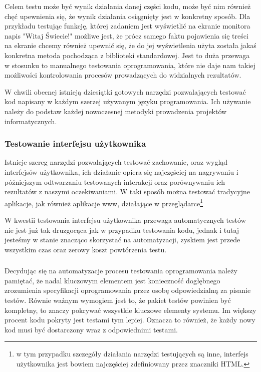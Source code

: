         Celem testu może być wynik działania danej części kodu, może być nim również chęć upewnienia się, że wynik działania osiągnięty jest w konkretny sposób. Dla przykładu testując funkcję, której zadaniem jest wyświetlić na ekranie monitora napis "Witaj Świecie!" możliwe jest, że prócz samego faktu pojawienia się treści na ekranie chcemy również upewnić się, że do jej wyświetlenia użyta została jakaś konkretna metoda pochodząca z biblioteki standardowej. Jest to duża przewaga w stosunku to manualnego testowania oprogramowania, które nie daje nam takiej możliwości kontrolowania procesów prowadzących do widzialnych rezultatów.

        W chwili obecnej istnieją dziesiątki gotowych narzędzi pozwalających testować kod napisany w każdym szerzej używanym języku programowania. Ich używanie należy do podstaw każdej nowoczesnej metodyki prowadzenia projektów informatycznych.
        
      \subsubsection{Testowanie interfejsu użytkownika}
        
        Istnieje szereg narzędzi pozwalających testować zachowanie, oraz wygląd interfejsów użytkownika, ich działanie opiera się najczęściej na nagrywaniu i późniejszym odtwarzaniu testowanych interakcji oraz porównywaniu ich rezultatów z naszymi oczekiwaniami. W taki sposób można testować tradycyjne aplikacje, jak również aplikacje www, działające w przeglądarce\footnote{w tym  przypadku szczegóły działania narzędzi testujących są inne, interfejs użytkownika jest bowiem najczęściej zdefiniowany przez znaczniki HTML.}
        
        W kwestii testowania interfejsu użytkownika przewaga automatycznych testów nie jest już tak druzgocąca jak w przypadku testowania kodu, jednak i tutaj jesteśmy w stanie znacząco skorzystać na automatyzacji, zyskiem jest przede wszystkim czas oraz zerowy koszt powtórzenia testu.
        
      \subsubsection{}

        Decydując się na automatyzacje procesu testowania oprogramowania należy pamiętać, że nadal kluczowym elementem jest konieczność dogłębnego zrozumienia specyfikacji oprogramowania przez osobę odpowiedzialną za pisanie testów. Równie ważnym wymogiem jest to, że pakiet testów powinien być kompletny, to znaczy pokrywać wszystkie kluczowe elementy systemu. Im większy procent kodu pokryty jest testami tym lepiej. Oznacza to również, że każdy nowy kod musi być dostarczony wraz z odpowiednimi testami.
        

